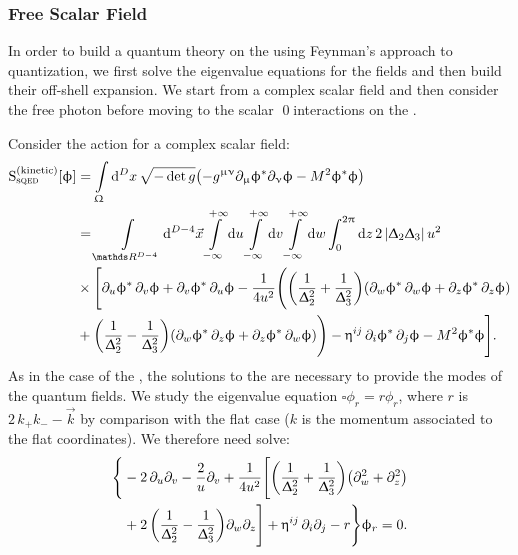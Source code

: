 \subsubsection{Free Scalar Field}

In order to build a quantum theory on the \gnbo using Feynman's approach to quantization, we first solve the eigenvalue equations for the fields and then build their off-shell expansion.
We start from a complex scalar field and then consider the free photon before moving to the scalar \qed interactions on the \gnbo.

Consider the action for a complex scalar field:
\begin{equation}
  \begin{split}
    \rS_{\text{s}\qed}^{(\text{kinetic})}\qty[ \phi ]
    & =
    \int\limits_{\Omega} \dd[D]{x}
    \sqrt{-\det g }
    \qty(%
      -g^{\mu\nu} \ipd{\mu} \phi^* \ipd{\nu} \phi - M^2 \phi^* \phi
    )
    \\
    & =
    \int\limits_{\R^{D-4}} \dd[D-4]{\vec{x}}
    \infinfint{u} \infinfint{v} \infinfint{w}
    \int_0^{2\pi} \dd z\,
    2\, \abs{\Delta_2 \Delta_3}\, u^2
    \\
    & \times
    \Biggl[%
      \ipd{u} \phi^*\, \ipd{v} \phi
      +
      \ipd{v} \phi^*\, \ipd{u} \phi
      -
      \frac{1}{4 u^2}
      \Biggl(
        \qty( \frac{1}{\Delta_2^2} + \frac{1}{\Delta_3^2} )
        \qty( \ipd{w} \phi^*\, \ipd{w} \phi + \ipd{z} \phi^*\, \ipd{z} \phi )
    \\
        & +
        \qty( \frac{1}{\Delta_2^2} - \frac{1}{\Delta_3^2} )
        \qty( \ipd{w} \phi^*\, \ipd{z} \phi + \ipd{z} \phi^*\, \ipd{w} \phi )
      \Biggr)
      -
      \eta^{ij}\, \ipd{i} \phi^*\, \ipd{j} \phi
      -
      M^2 \phi^* \phi
   \Biggr].
  \end{split}
\end{equation}
As in the case of the \nbo, the solutions to the \eom are necessary to provide the modes of the quantum fields.
We study the eigenvalue equation $\square \phi_r = r \phi_r$, where $r$ is $2\, k_+ k_- - \vec{k}$ by comparison with the flat case ($k$ is the momentum associated to the flat coordinates).
We therefore need solve:
\begin{equation}
  \begin{split}
    \Biggl\lbrace
        &
        -2\, \partial_{u} \partial_{v}
        - \frac{2}{u} \partial_{v}
        + \frac{1}{4 u^2}
        \Biggl[
            \qty( \frac{1}{\Updelta_2^2} + \frac{1}{\Updelta_3^2} )
            \qty( \partial_{w}^2 + \partial_{z}^2 )
    \\
            & +
            2\, \qty( \frac{1}{\Updelta_2^2} - \frac{1}{\Updelta_3^2} )
            \partial_{w} \partial_{z}          
        \Biggr]
        +
        \upeta^{ij}\, \partial_{i} \partial_{j}
        - r
    \Bigg\rbrace
    \upphi_r
    =
    0.
  \end{split}
  \label{eq:scalar_eom}
\end{equation}

